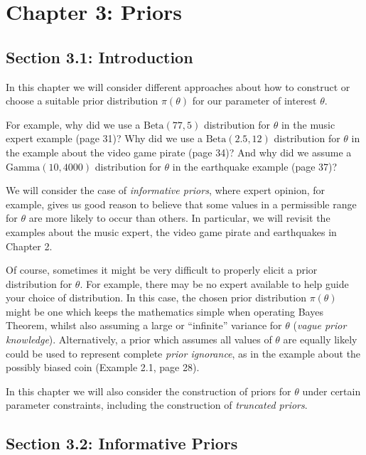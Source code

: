 \chapter{Chapter 3: Priors}
\section{Section 3.1: Introduction}
In this chapter we will consider different approaches about how to construct or choose a suitable prior distribution $\pi(\theta)$ for our parameter of interest $\theta$.  

For example, why did we use a $\mathrm{Beta}(77,5)$ distribution for $\theta$ in the music expert example (page 31)?  Why did we use a $\mathrm{Beta}(2.5,12)$ distribution for $\theta$ in the example about the video game pirate (page 34)?  And why did we assume a $\mathrm{Gamma}(10,4000)$ distribution for $\theta$ in the earthquake example (page 37)?


We will consider the case of \textit{informative priors}, where expert opinion, for example, gives us good reason to believe that some values in a permissible range for $\theta$ are more likely to occur than others.  In particular, we will revisit the examples about the music expert, the video game pirate and earthquakes in Chapter 2.  

Of course, sometimes it might be very difficult to properly elicit a prior distribution for $\theta$.  For example, there may be no expert available to help guide your choice of distribution.  In this case, the chosen prior distribution $\pi(\theta)$ might be one which keeps the mathematics simple when operating Bayes Theorem, whilst also assuming a large or ``infinite'' variance for $\theta$ (\textit{vague prior knowledge}).  Alternatively, a prior which assumes all values of $\theta$ are equally likely could be used to represent complete \textit{prior ignorance}, as in the example about the possibly biased coin (Example 2.1, page 28).   

In this chapter we will also consider the construction of priors for $\theta$ under certain parameter constraints, including the construction of \textit{truncated priors}.    




\section{Section 3.2: Informative Priors}

